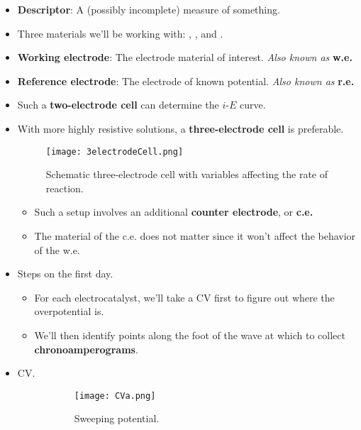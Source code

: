 \documentclass[../notes.tex]{subfiles}
\begin{document}
\begin{itemize}
\begin{itemize}
    \end{itemize}
    \item \textbf{Descriptor}: A (possibly incomplete) measure of something.
    \item Three materials we'll be working with: , , and .
    \item \textbf{Working electrode}: The electrode material of interest. \emph{Also known as} \textbf{w.e.}
    \item \textbf{Reference electrode}: The electrode of known potential. \emph{Also known as} \textbf{r.e.}
    \item Such a \textbf{two-electrode cell} can determine the $i$-$E$ curve.
    \item With more highly resistive solutions, a \textbf{three-electrode cell} is preferable.
    \begin{figure}[h!]
        \centering
        \texttt{[image: 3electrodeCell.png]}
        \caption{Schematic three-electrode cell with variables affecting the rate of reaction.}
        \label{fig:3electrodeCell}
    \end{figure}
    \begin{itemize}
        \item Such a setup involves an additional \textbf{counter electrode}, or \textbf{c.e.}
        \item The material of the c.e. does not matter since it won't affect the behavior of the w.e.
    \end{itemize}
    \item Steps on the first day.
    \begin{itemize}
        \item For each electrocatalyst, we'll take a CV first to figure out where the overpotential is.
        \item We'll then identify points along the foot of the wave at which to collect \textbf{chronoamperograms}.
    \end{itemize}
    \item CV.
    \begin{figure}[h!]
        \centering
        \begin{subfigure}[b]{0.45\linewidth}
            \centering
            \texttt{[image: CVa.png]}
            \caption{Sweeping potential.}
            \label{fig:CVa}
        \end{subfigure}
        \begin{subfigure}[b]{0.45\linewidth}

\end{subfigure}
\end{figure}
\end{itemize}
\end{document}
